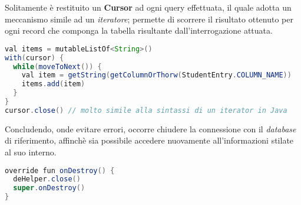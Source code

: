 \documentclass{article}
\begin{document}
Solitamente è restituito un \textbf{Cursor} ad ogni query effettuata, il quale adotta un meccanismo simile ad un \textit{iteratore}; permette di scorrere il risultato ottenuto per ogni record che componga la tabella risultante dall'interrogazione attuata.
\begin{lstlisting}[language=JAVA]
val items = mutableListOf<String>()
with(cursor) {
  while(moveToNext()) {
    val item = getString(getColumnOrThorw(StudentEntry.COLUMN_NAME))
    items.add(item)
  }
}
cursor.close() // molto simile alla sintassi di un iterator in Java
\end{lstlisting}
Concludendo, onde evitare errori, occorre chiudere la connessione con il \textit{database} di riferimento, affinchè sia possibile accedere nuovamente all'informazioni stilate al suo interno.
\begin{lstlisting}[language=JAVA]
override fun onDestroy() {
  deHelper.close()
  super.onDestroy()
}
\end{lstlisting}
\end{document}
